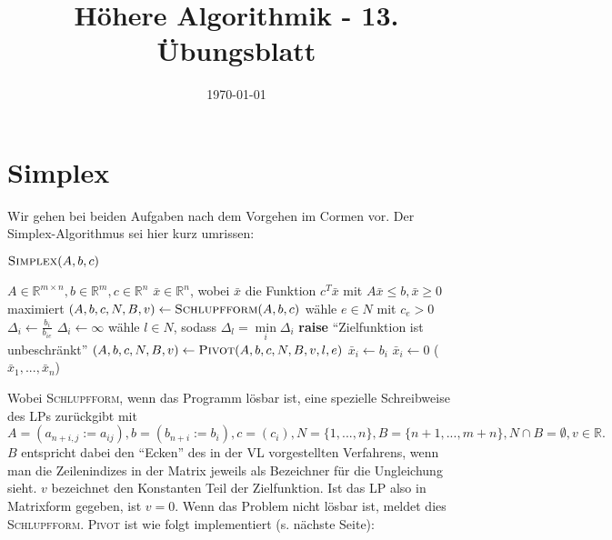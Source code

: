 \documentclass[a4paper,10pt]{article}
\title{Höhere Algorithmik - 13. Übungsblatt}
\author{\Authors}
\date{\today}
\begin{document}
\maketitle

\section{Simplex}
Wir gehen bei beiden Aufgaben nach dem Vorgehen im Cormen \cite[S. 793ff]{cormen} vor. Der Simplex-Algorithmus sei hier kurz umrissen:
\begin{center}
\begin{minipage}{\textwidth}
    $\textsc{Simplex}(A, b, c)$
    \begin{algorithmic}[1]
        \REQUIRE $A \in \mathbb{R}^{m \times n}, b \in \mathbb{R}^{m}, c \in \mathbb{R}^{n}$
        \ENSURE $\bar x \in \mathbb{R}^{n}$, wobei $\bar x$ die Funktion $c^T \bar x$ mit $A\bar x \leq b, \bar x \geq 0$ maximiert
        \STATE $(A,b,c,N,B,v) \gets \textsc{Schlupfform}(A,b,c)$
            \STATE wähle $e \in N$ mit $c_e > 0$
                    \STATE $\Delta_i \gets \frac{b_i}{b_{ie}}$
                \ELSE
                    \STATE $\Delta_i \gets \infty$
                \ENDIF
            \ENDFOR
            \STATE wähle $l \in N$, sodass $\Delta_l = \min\limits_i \Delta_i$
                \STATE \textbf{raise} "`Zielfunktion ist unbeschränkt"'
            \ELSE
                \STATE $(A,b,c,N,B,v) \gets \textsc{Pivot}(A,b,c,N,B,v,l,e)$
            \ENDIF
        \ENDWHILE
                \STATE $\bar x_i \gets b_i$
            \ELSE
                \STATE $\bar x_i \gets 0$
            \ENDIF
        \ENDFOR
        \RETURN ($\bar x_1, ..., \bar x_n$)
    \end{algorithmic}
\end{minipage}
\end{center}
Wobei \textsc{Schlupfform}, wenn das Programm lösbar ist, eine spezielle Schreibweise des LPs zurückgibt mit 
\[A = (a_{n+i,j} := a_{ij}), b = (b_{n+i} := b_i), c = (c_i), N = \{1, ..., n\}, B = \{n+1, ..., m{+}n\}, N \cap B = \emptyset, v \in \mathbb{R}.\] 
$B$ entspricht dabei den "`Ecken"' des in der VL vorgestellten Verfahrens, wenn man die Zeilenindizes in der Matrix jeweils als Bezeichner für die Ungleichung sieht. $v$ bezeichnet den Konstanten Teil der Zielfunktion. Ist das LP also in Matrixform gegeben, ist $v = 0$. Wenn das Problem nicht lösbar ist, meldet dies \textsc{Schlupfform}. \textsc{Pivot} ist wie folgt implementiert (s. nächste Seite):
\end{document}
